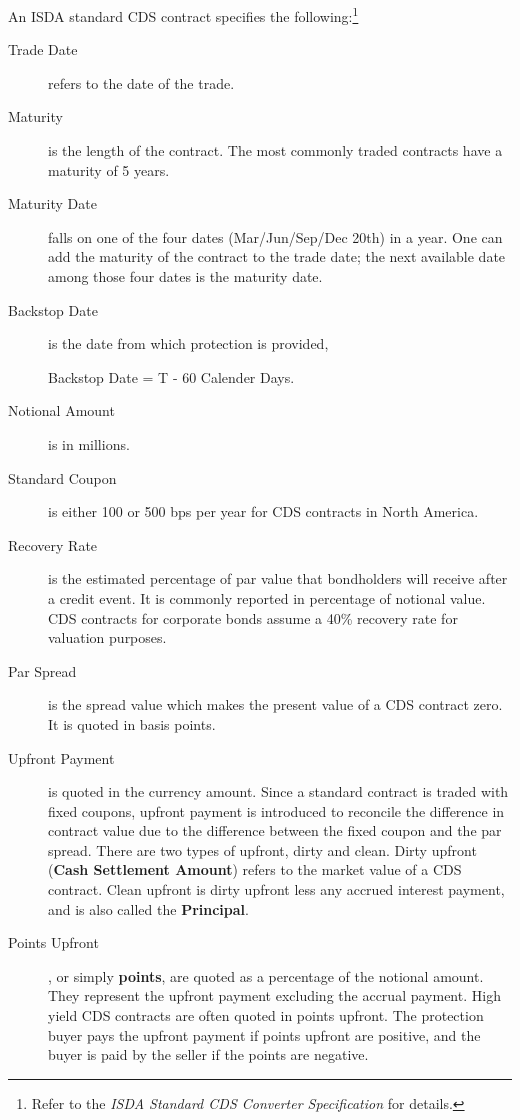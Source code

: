 \documentclass[a4paper]{article}
\begin{document}
An ISDA standard CDS contract specifies the following:\footnote{Refer
  to the \textit{ISDA Standard CDS Converter Specification} for
  details.}
\begin{description}
\item[Trade Date] refers to the date of the trade.
\item[Maturity] is the length of the contract. The most commonly traded
  contracts have a maturity of 5 years.
\item[Maturity Date] falls on one of the four dates (Mar/Jun/Sep/Dec
  20th) in a year. One can add the maturity of the contract to the
  trade date; the next available date among those four dates is the
  maturity date.
\item[Backstop Date] is the date from which protection is
  provided,
  \begin{center}
    Backstop Date = T - 60 Calender Days.
  \end{center}
\item[Notional Amount] is in millions.
\item[Standard Coupon] is either 100 or 500 bps per
  year for CDS contracts in North America.
\item[Recovery Rate] is the estimated percentage of par value that
  bondholders will receive after a credit event. It is commonly
  reported in percentage of notional value. CDS contracts for corporate bonds
  assume a 40\% recovery rate for valuation purposes. 
\item[Par Spread] is the spread value which makes the present value
  of a CDS contract zero. It is quoted in basis points.  
\item[Upfront Payment] is quoted in the currency amount. Since a
  standard contract is traded with fixed coupons, upfront payment is
  introduced to reconcile the difference in contract value due to the
  difference between the fixed coupon and the par
  spread. There are two types of upfront, dirty and clean. Dirty
  upfront (\textbf{Cash Settlement Amount}) refers to the market
  value of a CDS contract. Clean upfront is dirty upfront less any
  accrued interest payment, and is also called the \textbf{Principal}.
\item[Points Upfront], or simply \textbf{points}, are quoted as a
  percentage of the notional amount. They represent the upfront
  payment excluding the accrual payment. High yield CDS contracts
  are often quoted in points upfront. The protection buyer pays the
  upfront payment if points upfront are positive, and the buyer is
  paid by the seller if the points are negative.
\end{description}
\end{document}
